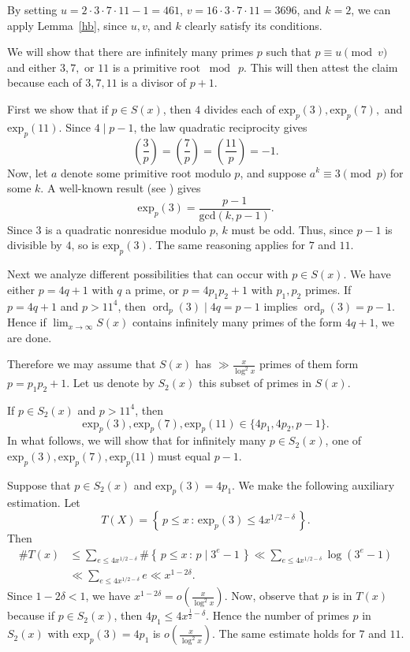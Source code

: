 \documentclass{elsart}
\newcommand{\set}[2]{\left \{\, #1 \,\colon \, #2 \, \right \}}
\DeclareMathOperator{\ord}{ord}
\begin{document}
\begin{pf}
By  setting $u = 2 \cdot 3 \cdot 7 \cdot 11 - 1 = 461$, $v = 16 \cdot 3 \cdot 7 \cdot 11=3696$, and $k=2$, we can
apply Lemma~\ref{hb}, since  $u,v$, and $k$ clearly satisfy its conditions.

We will show that there are infinitely many primes $p$ such that $p \equiv u \pmod{v}$ and either $3,7,$ or $11$ is a primitive root $\bmod\ p$. This will then attest the claim because each of $3,7,11$ is a divisor of $p+1$.

First we show that if $p \in S(x)$, then $4$ divides each of $\mbox{exp}_p(3), \mbox{exp}_p(7),$ and $\mbox{exp}_p(11)$.
Since $4 \mid p - 1$,  the law quadratic reciprocity gives
\[
\left( \frac{3}{p} \right) = \left( \frac{7}{p} \right) = \left( \frac{11}{p} \right) = -1.
\]
Now, let $a$ denote some primitive root  modulo $p$, and suppose $a^k \equiv 3 \pmod{p}$ for some $k$. A well-known result
(see \cite[Lemma~1 on p. 206]{Apo})
gives
\[
\mbox{exp}_p(3) = \frac{p-1}{\mbox{gcd}(k,p-1)}.
\]
Since $3$ is a quadratic nonresidue modulo $p$, $k$ must be odd. Thus, since $p-1$ is divisible by $4$, so is $\mbox{exp}_p(3)$. The same reasoning applies for $7$ and $11$.

Next we analyze different possibilities that can occur with $p\in S(x)$. We have either $p=4q + 1$ with $q$ a prime, or $p=4p_1 p_2 + 1$ with $p_1,p_2$ primes. If $p=4q + 1$  and $p > 11^4$, then  $\ord_p(3) \mid 4q = p - 1$ implies $\ord_p(3) = p - 1$. Hence if $\lim_{x\rightarrow \infty} S(x)$ contains infinitely many primes of the form $4q+1$, we are done.

Therefore we may assume that $S(x)$ has  $\gg \tfrac{x}{\log^2 x}$ primes of them form $p=p_1 p_2 +1$. Let us denote by $S_2(x)$ this subset of primes in $S(x)$.

If $p \in S_2(x)$ and $p > 11^4$, then
\[
\mbox{exp}_p(3), \mbox{exp}_p(7), \mbox{exp}_p(11) \in \{4p_1 ,4p_2, p-1\}.
\]
In what follows, we will show that for infinitely many $p\in S_2(x)$, one of $\mbox{exp}_p(3), \mbox{exp}_p(7), \mbox{exp}_p(11$ ) must equal $p-1$.

Suppose that $p \in S_2(x)$ and $\mbox{exp}_p(3) = 4p_1$. We make the following auxiliary estimation. Let
\[
T(X) = \set{p \leq x}{ \mbox{exp}_p(3) \leq 4x^{1/2-\delta} }.
\]
Then
\begin{align*}
\# T(x) &
\leq
\sum_{e \leq 4x^{1/2-\delta}} \# \set{p \leq x}{ p \mid 3^e - 1}
\ll
\sum_{e \leq 4x^{1/2-\delta}} \log(3^e - 1)
\\
&
\ll
\sum_{e \leq 4x^{1/2-\delta}} e
\ll
x^{1-2\delta}.
\end{align*}
Since $1-2\delta < 1$, we have $x^{1-2\delta} = o\left(\tfrac{x}{\log^2 x}\right)$.
Now, observe  that $p$ is in $T(x)$ because if $p \in S_2(x)$, then  $4 p_1 \leq 4x^{\tfrac{1}{2} - \delta}$.
Hence the number of primes $p$ in $S_2(x)$ with $\mbox{exp}_p(3) = 4p_1$ is $o\left(\tfrac{x}{\log^2 x}\right)$.
The same estimate holds for $7$ and $11$.


\end{pf}
\end{document}

